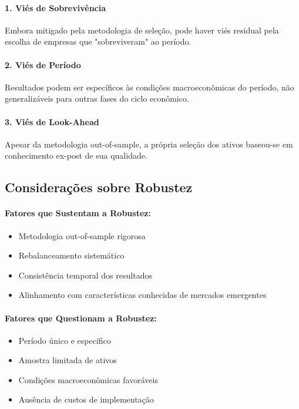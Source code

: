 \paragraph{1. Viés de Sobrevivência}
Embora mitigado pela metodologia de seleção, pode haver viés residual pela escolha de empresas que "sobreviveram" ao período.

\paragraph{2. Viés de Período}
Resultados podem ser específicos às condições macroeconômicas do período, não generalizáveis para outras fases do ciclo econômico.

\paragraph{3. Viés de Look-Ahead}
Apesar da metodologia out-of-sample, a própria seleção dos ativos baseou-se em conhecimento ex-post de sua qualidade.

\subsection{Considerações sobre Robustez}

\paragraph{Fatores que Sustentam a Robustez:}
\begin{itemize}
    \item Metodologia out-of-sample rigorosa
    \item Rebalanceamento sistemático
    \item Consistência temporal dos resultados
    \item Alinhamento com características conhecidas de mercados emergentes
\end{itemize}

\paragraph{Fatores que Questionam a Robustez:}
\begin{itemize}
    \item Período único e específico
    \item Amostra limitada de ativos
    \item Condições macroeconômicas favoráveis
    \item Ausência de custos de implementação
\end{itemize}

